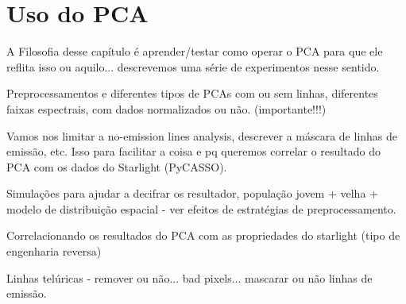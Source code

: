



\chapter{Uso do PCA}
\label{sec:UsoPCA}

A Filosofia desse capítulo é aprender/testar como operar o PCA para que ele 
reflita isso ou aquilo... descrevemos uma série de experimentos nesse sentido.

Preprocessamentos e diferentes tipos de PCAs com ou sem linhas, diferentes 
faixas espectrais, com dados normalizados ou não. (importante!!!)

Vamos nos limitar a no-emission lines analysis, descrever a máscara de linhas 
de emissão, etc. Isso para facilitar a coisa e pq queremos correlar o 
resultado do PCA com os dados do Starlight (PyCASSO).

Simulações para ajudar a decifrar os resultador, população jovem + velha + 
modelo de distribuição espacial - ver efeitos de estratégias de 
preprocessamento.

Correlacionando os resultados do PCA com as propriedades do starlight (tipo de 
engenharia reversa)

Linhas telúricas - remover ou não... bad pixels... mascarar ou não linhas de 
emissão.